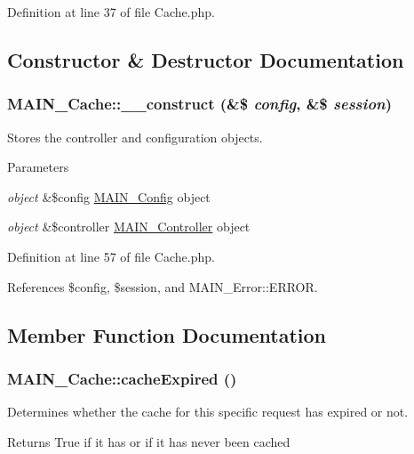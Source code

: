 Definition at line 37 of file Cache.php.

\subsection{Constructor \& Destructor Documentation}
\hypertarget{classMAIN__Cache_acf1b5cb6aadded08ca6e99c026ccb002}{
\subsubsection[{\_\-\_\-construct}]{\setlength{\rightskip}{0pt plus 5cm}MAIN\_\-Cache::\_\-\_\-construct (\&\$ {\em config}, \/  \&\$ {\em session})}}
\label{d2/d41/classMAIN__Cache_acf1b5cb6aadded08ca6e99c026ccb002}
Stores the controller and configuration objects.


\begin{DoxyParams}{Parameters}
\item[{\em object}]\&\$config \hyperlink{classMAIN__Config}{MAIN\_\-Config} object \item[{\em object}]\&\$controller \hyperlink{classMAIN__Controller}{MAIN\_\-Controller} object \end{DoxyParams}


Definition at line 57 of file Cache.php.

References \$config, \$session, and MAIN\_\-Error::ERROR.

\subsection{Member Function Documentation}
\hypertarget{classMAIN__Cache_a217d6d4359eeb584a532364b9edbba87}{
\subsubsection[{cacheExpired}]{\setlength{\rightskip}{0pt plus 5cm}MAIN\_\-Cache::cacheExpired ()}}
\label{d2/d41/classMAIN__Cache_a217d6d4359eeb584a532364b9edbba87}
Determines whether the cache for this specific request has expired or not.

\begin{DoxyReturn}{Returns}
True if it has or if it has never been cached 
\end{DoxyReturn}


